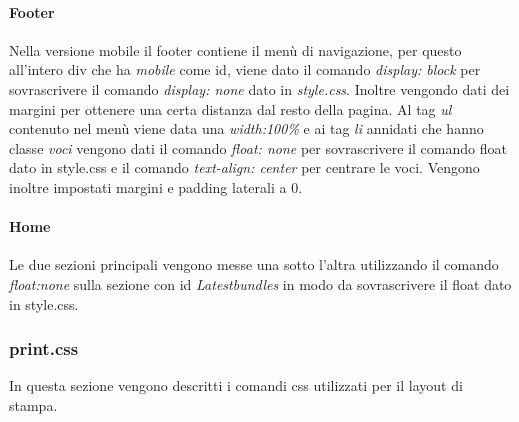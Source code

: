 \paragraph{Footer} \Spazio
Nella versione mobile il footer contiene il menù di navigazione, per questo all'intero div che ha \emph{mobile} come id, viene dato il comando \emph{display: block} per sovrascrivere il comando \emph{display: none} dato in \emph{style.css}. Inoltre vengondo dati dei margini per ottenere una certa distanza dal resto della pagina.\newline
Al tag \emph{ul} contenuto nel menù viene data una \emph{width:100\%} e ai tag \emph{li} annidati che hanno classe \emph{voci} vengono dati il comando \emph{float: none} per sovrascrivere il comando float dato in style.css e il comando \emph{text-align: center} per centrare le voci.
Vengono inoltre impostati margini e padding laterali a 0.

\paragraph{Home} \Spazio
Le due sezioni principali vengono messe una sotto l'altra utilizzando il comando \emph{float:none} sulla sezione con id \emph{Latestbundles} in modo da sovrascrivere il float dato in style.css.


\subsubsection{print.css}
In questa sezione vengono descritti i comandi css utilizzati per il layout di stampa.
